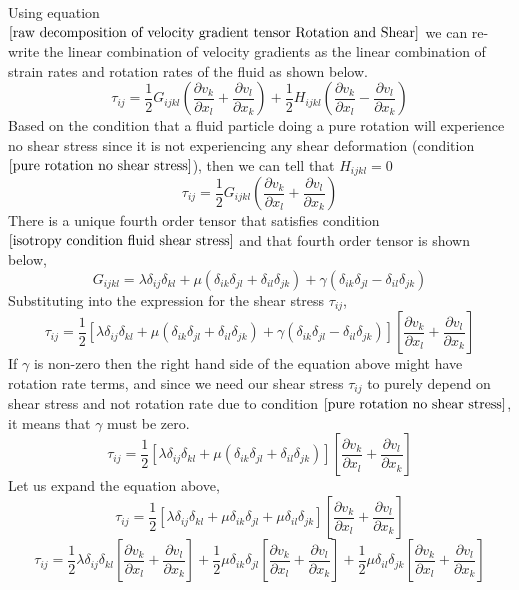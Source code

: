Using equation $\ref{raw decomposition of velocity gradient tensor Rotation and Shear}$ we can re-write the linear combination of velocity gradients as the linear combination of strain rates and rotation rates of the fluid as shown below.
$$\tau_{ij} = \frac{1}{2}G_{ijkl}\left(\frac{\partial v_{k}}{\partial x_{l}} + \frac{\partial v_{l}}{\partial x_{k}}\right) + \frac{1}{2}H_{ijkl}\left(\frac{\partial v_{k}}{\partial x_{l}} - \frac{\partial v_{l}}{\partial x_{k}}\right)$$
Based on the condition that a fluid particle doing a pure rotation will experience no shear stress since it is not experiencing any shear deformation (condition $\ref{pure rotation no shear stress}$), then we can tell that $H_{ijkl} = 0$
$$\tau_{ij} = \frac{1}{2}G_{ijkl}\left(\frac{\partial v_{k}}{\partial x_{l}} + \frac{\partial v_{l}}{\partial x_{k}}\right)$$
There is a unique fourth order tensor that satisfies condition $\ref{isotropy condition fluid shear stress}$ and that fourth order tensor is shown below,
$$G_{ijkl} = \lambda \delta_{ij}\delta_{kl} + \mu(\delta_{ik}\delta_{jl} + \delta_{il}\delta_{jk}) + \gamma(\delta_{ik}\delta_{jl} - \delta_{il}\delta_{jk})$$
Substituting into the expression for the shear stress $\tau_{ij}$,
$$\tau_{ij} = \frac{1}{2}[\lambda \delta_{ij}\delta_{kl} + \mu(\delta_{ik}\delta_{jl} + \delta_{il}\delta_{jk}) + \gamma(\delta_{ik}\delta_{jl} - \delta_{il}\delta_{jk})]\left[\frac{\partial v_{k}}{\partial x_{l}} + \frac{\partial v_{l}}{\partial x_{k}}\right]$$
If $\gamma$ is non-zero then the right hand side of the equation above might have rotation rate terms, and since we need our shear stress $\tau_{ij}$ to purely depend on shear stress and not rotation rate due to condition $\ref{pure rotation no shear stress}$, it means that $\gamma$ must be zero.
$$\tau_{ij} = \frac{1}{2}[\lambda \delta_{ij}\delta_{kl} + \mu(\delta_{ik}\delta_{jl} + \delta_{il}\delta_{jk})]\left[\frac{\partial v_{k}}{\partial x_{l}} + \frac{\partial v_{l}}{\partial x_{k}}\right]$$
Let us expand the equation above,
$$\tau_{ij} = \frac{1}{2}[\lambda \delta_{ij}\delta_{kl} + \mu\delta_{ik}\delta_{jl} + \mu\delta_{il}\delta_{jk}]\left[\frac{\partial v_{k}}{\partial x_{l}} + \frac{\partial v_{l}}{\partial x_{k}}\right]$$
\begin{equation}
\tau_{ij} = \frac{1}{2}\lambda \delta_{ij}\delta_{kl}\left[\frac{\partial v_{k}}{\partial x_{l}} + \frac{\partial v_{l}}{\partial x_{k}}\right]
 + \frac{1}{2}\mu\delta_{ik}\delta_{jl}\left[\frac{\partial v_{k}}{\partial x_{l}} + \frac{\partial v_{l}}{\partial x_{k}}\right]
 + \frac{1}{2}\mu\delta_{il}\delta_{jk}\left[\frac{\partial v_{k}}{\partial x_{l}} + \frac{\partial v_{l}}{\partial x_{k}}\right]
\label{shear stress fluid primitive part 1}
\end{equation}
